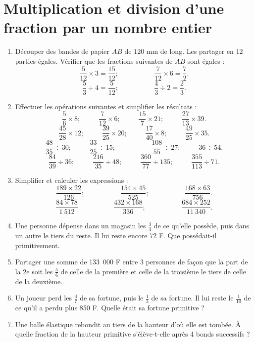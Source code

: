 
\chapter{Multiplication et division d'une fraction par un nombre entier}
 
 \begin{enumerate}
 \item Découper des bandes de papier $AB$ de $120$ mm de long. Les partager en 12 parties égales. Vérifier 
 que les fractions suivantes de $AB$ sont égales : 
 \[ \frac5{12}\times 3 = \frac{15}{12}; \phantom{meow}\phantom{meow}\frac7{12}\times 6 = \frac72. \]
 \[ \frac53\div4=\frac5{12}; \phantom{meow}\phantom{meow}\frac43\div2=\frac23.\]
\item Effectuer les opérations suivantes et simplifier les résultats : 
\[ \frac56\times 8 ; \phantom{meow} \frac7{12}\times6; 
\phantom{meow}\frac{15}7\times21; \phantom{meow}
\frac{27}{13}\times 39.\] 
\[ \frac{45}{28} \times 12; \phantom{meow} \frac{39}{25} \times 20; \phantom{meow} 
\frac{17}{40}\times 8;\phantom{meow} \frac{49}{25}\times35 .\]
\[\frac{48}{35}\div30; \phantom{meow} \frac{33}{25}\div 15 ; \phantom{meow}\phantom{meow}
\frac{108}{55}\div 27 ; \phantom{meow} 
36 \div 54. \]
\[ \frac{84}{39}\div 36; \phantom{meow}
\frac{216}{35}\div 48 ; \phantom{meow}
\frac{360}{77}\div 135; \phantom{meow}
\frac{355}{113}\div 71.\]
\item Simplifier et calculer les expressions : 
\[ \frac{189\times 22}{126}; \phantom{meow}\phantom{meow} \frac{154\times 45}{525} ; \phantom{meow}\phantom{meow} \frac{168\times 63}{756}.\]
\[\frac{84\times 78}{1~512}\phantom{meow}\phantom{meow} \frac{432\times 168}{336} ; 
\phantom{meow}\phantom{meow} \frac{684\times 252}{11~340}.\]
\item Une personne dépense dans un magasin les $\frac34$ de ce qu'elle possède, puis dans un autre le tiers du reste. Il lui reste encore 72 F. Que possédait-il primitivement.
\item Partager une somme de 133~000 F entre 3 personnes de façon que la part de la 2e soit les $\frac56$ de celle de la première et celle de la troisième le tiers de celle de la deuxième. 
\item Un joueur perd les $\frac37$ de sa fortune, puis le $\frac13$ de sa fortune. Il lui reste le $\frac1{10}$ de ce qu'il a perdu plus 850 F. Quelle était sa fortune primitive ? 
\item Une balle élastique rebondit au tiers de la hauteur d'où elle est tombée. À quelle fraction de la hauteur primitive s'élève-t-elle après 4 bonds successifs ? 

\end{enumerate}
